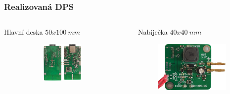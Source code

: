 \documentclass[%
  12pt,       				%
	t,                  %
	aspectratio=1610,   %
	unicode,						%
]{beamer}				    	%
\begin{document}


\begin{frame}
	\frametitle{Realizovaná DPS}
	\begin{columns}
		\begin{column}{0.6\textwidth}
			\centering
			Hlavní deska $50x100~mm$
			\begin{figure}
				\centering
				\begin{figure}
					\includegraphics[width=0.85\textwidth]{obrazky/final_pcb_both.png}
				\end{figure}
			\end{figure}
		\end{column}

		\begin{column}{0.4\textwidth}
			\centering
			Nabíječka $40x40~mm$
			\begin{figure}
				\centering
				\vspace{8ex}
				\includegraphics[width=0.9\textwidth]{obrazky/batteryCharger-final.png}
			\end{figure}
		\end{column}
	\end{columns}
\end{frame}
\end{document}
